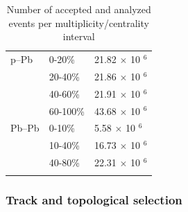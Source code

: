 \begin{table}[h!]
\centering
\begin{tabular}{lll}
\hline

p--Pb &   0-20\% &21.82 $\times$ 10 $^{6}$ \\
& 20-40\% &21.86 $\times$ 10 $^{6}$\\
& 40-60\% &21.91 $\times$ 10 $^{6}$ \\
& 60-100\% &43.68 $\times$ 10 $^{6}$ \\

\hline \noalign{\smallskip}

Pb--Pb& 0-10\%   & 5.58 $\times$ 10 $^{6}$ \\
& 10-40\%    & 16.73 $\times$ 10 $^{6}$ \\
& 40-80\% & 22.31 $\times$ 10 $^{6}$ \\
\hline\noalign{\smallskip}
\noalign{\smallskip}
\end{tabular}
\caption{Number of accepted and analyzed events per multiplicity/centrality interval}\label{table:NCentralityEvent}
\end{table}


\newpage
\subsubsection{Track and topological selection}\label{sec:Cut}

